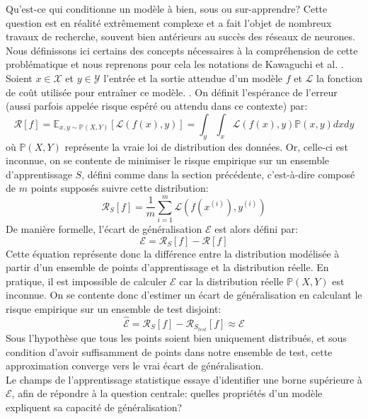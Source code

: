 Qu'est-ce qui conditionne un modèle à bien, sous ou sur-apprendre? Cette question est en réalité extrêmement complexe et a fait l'objet de nombreux travaux de recherche, souvent bien antérieurs au succès des réseaux de neurones. Nous définissons ici certains des concepts nécessaires à la compréhension de cette problématique et nous reprenons pour cela les notations de Kawaguchi et al. \cite{kawaguchiGeneralizationDeepLearning2018}.
\\
Soient $x \in \mathcal{X}$ et $y \in \mathcal{Y}$ l'entrée et la sortie attendue d'un modèle $f$ et $\mathcal{L}$ la fonction de coût utilisée pour entraîner ce modèle. .
On définit l'espérance de l'erreur (aussi parfois appelée risque espéré ou attendu dans ce contexte) par:
\begin{equation}
	\mathcal{R}[f] = \mathbb{E}_{x, y \sim \mathbb{P}(X, Y)}[\mathcal{L}(f(x), y)] = \int_y\int_x \mathcal{L}(f(x), y)\mathbb{P}(x, y)dxdy
\end{equation}
où $\mathbb{P}(X, Y)$ représente la vraie loi de distribution des données. Or, celle-ci est inconnue, on se contente de minimiser le risque empirique sur un ensemble d'apprentissage $S$, défini comme dans la section précédente, c'est-à-dire composé de $m$ points supposés suivre cette distribution:
\begin{equation}
	\mathcal{R}_S[f] = \frac{1}{m} \sum_{i=1}^{m} \mathcal{L}(f(x^{(i)}), y^{(i)})
\end{equation}
De manière formelle, l'écart de généralisation $\mathcal{E}$ est alors défini par:
\begin{equation}
	\mathcal{E} =  \mathcal{R}_S[f] - \mathcal{R}[f]
\end{equation}
Cette équation représente donc la différence entre la distribution modélisée à partir d'un ensemble de points d'apprentissage et la distribution réelle.
En pratique, il est impossible de calculer $\mathcal{E}$ car la distribution réelle $\mathbb{P}(X, Y)$ est inconnue. On se contente donc d'estimer un écart de généralisation en calculant le risque empirique sur un ensemble de test disjoint:
\begin{equation}
	 \hat{\mathcal{E}} =\mathcal{R}_S[f] - \mathcal{R}_{S_{test}}[f] \approx \mathcal{E}
\end{equation}
Sous l'hypothèse que tous les points soient bien uniquement distribués, et sous condition d'avoir suffisamment de points dans notre ensemble de test, cette approximation converge vers le vrai écart de généralisation. \\
Le champs de l'apprentissage statistique essaye d'identifier une borne supérieure à $\mathcal{E}$, afin de répondre à la question  centrale: quelles propriétés d'un modèle expliquent sa capacité de généralisation? \\
